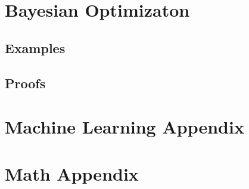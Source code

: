 \documentclass[
  fourColumns,
  landscape
]{formularyETH/formularyETH}
\begin{document}
     \section{Bayesian Optimizaton}\label{sec:bayesian_optimizaton}


    \subsection{Examples}\label{subsec:examples}
    
    \subsection{Proofs}\label{subsec:proofs}
    






% 
\newpage  
\section*{Machine Learning Appendix}\label{sec:ml_appendix}
  
\newpage  
\section*{Math Appendix}\label{sec:math_appendix}

\end{document}
